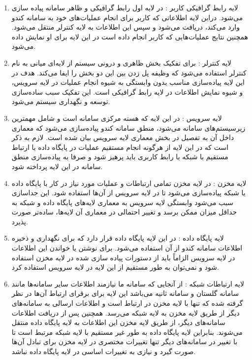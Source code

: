\documentclass{report}
\begin{document}
\begin{enumerate}
\item
لایه رابط گرافیکی کاربر
:
در لایه اول رابط گرافیکی و ظاهر سامانه پیاده سازی می‌شود. دراین لایه اطلاعاتی که کاربر برای انجام عملیات‌های خود به سامانه کندو وارد می‌کند، دریافت می‌شود و سپس این اطلاعات به لایه کنترلر منتقل می‌شود. همچنین نتایج عملیات‌هایی که کاربر انجام داده است در این لایه برای او نمایش داده می‌شود.
\item
لایه کنترلر
:
برای تفکیک بخش ظاهری و درونی سیستم از لایه‌ای میانی به نام کنترلر استفاده می‌شود که وظیفه پل زدن بین این دو بخش را ایفا می‌کند. هدف در این لایه پیاده‌سازی 
 مناسب بدون وابستگی به شیوه انجام عملیات در لایه سرویس، و شیوه نمایش اطلاعات در لایه رابط گرافیکی است. این تفکیک سبب ساده‌سازی توسعه و نگهداری سیستم می‌شود.
\item
لایه سرویس
:
در این لایه که هسته مرکزی سامانه است و شامل مهمترین زیرسیستم‌های سامانه می‌شود، منطق سامانه کندو پیاده‌سازی می‌شود که معماری داخل آن به تفصیل در بخش معماری لایه سرویس بیان شده است. لازم به ذکر است که در این لایه از هرگونه انجام مستقیم عملیات در پایگاه داده یا ارتباط مستقیم با شبکه یا رابط کاربری باید پرهیز شود و صرفا به پیاده‌سازی منطق سامانه در این لایه پرداخته شود.
\item
لایه مخزن
:
در لایه مخزن تمامی ارتباطات و عملیات مورد نیاز در کار با پایگاه داده یا شبکه پیاده‌سازی می‌شود تا در لایه سرویس از آن‌ها استفاده شود. این جداسازی سبب می‌شود وابستگی لایه سرویس به معماری لایه‌های پایگاه داده و شبکه به حداقل میزان ممکن برسد و تغییر احتمالی در معماری آن لایه‌ها، ساده‌تر صورت پذیرد.
\item
لایه پایگاه داده
:
در این لایه پایگاه داده قرار دارد که برای نگهداری و ذخیره اطلاعات سامانه کندو از آن استفاده می‌شود. برای نوشتن یا خواندن این اطلاعات در لایه سرویس الزاماً باید از دستورات پیاده سازی شده در لایه مخزن استفاده شود و نمی‌توان به طور مستقیم از این لایه در لایه سرویس استفاده کرد.
\item
لایه ارتباطات شبکه
:
از آنجایی که سامانه ما نیازمند اطلاعات سایر سامانه‌ها مانند سامانه گلستان و سامانه ثانیه می‌باشد این لایه برای برقرای ارتباط آن‌ها در نظر گرفته شده که تنها با لایه مخزن در ارتباط است و اطلاعات ارسالی به سامانه‌های دیگر از طریق لایه مخزن به لایه شبکه می‌رسد. همچنین پس از دریافت اطلاعات سامانه‌های دیگر، از طریق لایه مخزن این اطلاعات به لایه پایگاه داده منتقل می‌شوند. بنابراین لایه پایگاه داده به طور غیر مستقیم با لایه شبکه مرتبط است تا با تغییر در سامانه‌های دیگر تنها تغییرات مختصری در لایه مخزن برای تبادل آن‌ها صورت گیرد و نیازی به تغییرات اساسی در لایه پایگاه داده نباشد.

\end{enumerate}
\end{document}
